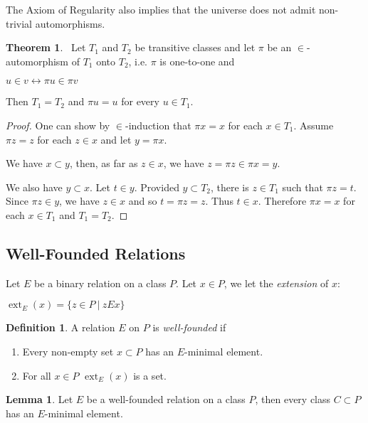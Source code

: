 \documentclass[8pt]{article}
\theoremstyle{definition}
\newtheorem{definition}{Definition}[section]
\theoremstyle{definition}
\newtheorem{theorem}{Theorem}[section]
\theoremstyle{definition}
\theoremstyle{definition}
\theoremstyle{definition}
\theoremstyle{definition}
\theoremstyle{definition}
\theoremstyle{definition}
\newtheorem{lemma}{Lemma}[section]
\theoremstyle{definition}
\theoremstyle{definition}
\theoremstyle{definition}
\theoremstyle{definition}
\theoremstyle{definition}
\theoremstyle{definition}
\theoremstyle{question}
\begin{document}
The Axiom of Regularity also implies that the universe does not admit non-trivial automorphisms.

\begin{theorem}~\label{trivialautomors}
  Let $T_1$ and $T_2$ be transitive classes and let $\pi$ be an $\in$-automorphism
  of $T_1$ onto $T_2$, i.e. $\pi$ is one-to-one and
  \begin{center}
    $u \in v \leftrightarrow \pi u \in \pi v$
  \end{center}

  Then $T_1 = T_2$ and $\pi u = u$ for every $u \in T_1$.
\end{theorem}
\begin{proof}
  One can show by $\in$-induction that $\pi x = x$ for each $x \in T_1$.
  Assume $\pi z = z$ for each $z \in x$ and let $y = \pi x$.

  We have $x \subset y$, then, as far as $z \in x$, we have $z = \pi z \in \pi x = y$.

  We also have $y \subset x$. Let $t \in y$. Provided $y \subset T_2$, there is
  $z \in T_1$ such that $\pi z = t$. Since $\pi z \in y$, we have $z \in x$ and so
  $t = \pi z = z$. Thus $t \in x$.
  Therefore $\pi x = x$ for each $x \in T_1$ and $T_1 = T_2$.
\end{proof}

\subsection{Well-Founded Relations}

Let $E$ be a binary relation on a class $P$. Let $x \in P$, we let the \emph{extension} of $x$:
\begin{center}
  $\operatorname{ext}_E(x) = \{ z \in P \: | \: z E x \}$
\end{center}

\begin{definition}
  A relation $E$ on $P$ is \emph{well-founded} if
  \begin{enumerate}
    \item Every non-empty set $x \subset P$ has an $E$-minimal element. 
    \item For all $x \in P$ $\operatorname{ext}_E(x)$ is a set.
  \end{enumerate}
\end{definition}

\begin{lemma}
  Let $E$ be a well-founded relation on a class $P$, then every class $C \subset P$ has an $E$-minimal element.
\end{lemma}
\end{document}
